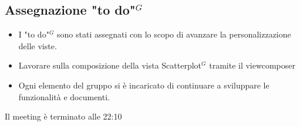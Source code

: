 \subsection{Assegnazione "to do"$^{G}$}
\begin{itemize}
	\item I "to do"$^{G}$ sono stati assegnati con lo scopo di avanzare la personalizzazione delle viste.
	\item Lavorare sulla composizione della vista Scatterplot$^{G}$ tramite il viewcomposer
	\item Ogni elemento del gruppo si è incaricato di continuare a sviluppare le funzionalità e documenti.
\end{itemize}

Il meeting è terminato alle 22:10

